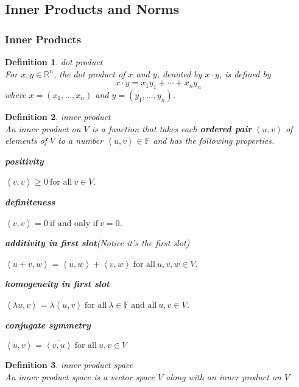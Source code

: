 \documentclass{article}
\newtheorem{definition}{Definition}[subsection]
\newcommand{\RR}{\mathbb{R}}
\newcommand{\FF}{\mathbb{F}}
\begin{document}
\begin{CJK}{UTF8}{gkai}
\subsection{Inner Products and Norms}

\subsubsection{Inner Products}

\begin{definition}
    dot product\\

    For $x,y \in \RR^n$, the dot product of $x$ and $y$, denoted by $x \cdot y$, is defined by
    \[x \cdot y = x_1y_1 +\cdots+x_n y_n\]
    where $x = (x_1,\ldots,x_n)$ and $y = (y_1,\ldots,y_n)$.
\end{definition}

\begin{definition}
    inner product\\

    An inner product on $V$ is a function that takes each \textbf{ordered pair} $(u,v)$ of elements of $V$ to a number $\left<u,v\right> \in \FF$ and has the following properties.

    \textbf{positivity}

    $\left<v, v\right> \geq 0 ~\text{for all}~ v \in V$.

    \textbf{definiteness}

    $\left<v, v\right> = 0 ~\text{if and only if}~ v = 0$.

    \textbf{additivity in first slot}(Notice it's the first slot)

    $\left<u +v,w\right> = \left<u,w\right>+\left<v,w\right> ~\text{for all}~ u,v,w \in V$.

    \textbf{homogeneity in first slot}

    $\left<\lambda u,v\right> = \lambda\left<u,v\right> ~\text{for all}~ \lambda \in \FF ~\text{and all}~ u,v \in V$.
    
    \textbf{conjugate symmetry}
    
    $\left<u, v\right> = \overline{\left<v,u\right>} ~\text{for all}~ u,v \in V$
\end{definition}

\begin{definition}
    inner product space\\

    An inner product space is a vector space $V$ along with an inner product on $V$
\end{definition}


\end{CJK}
\end{document}
